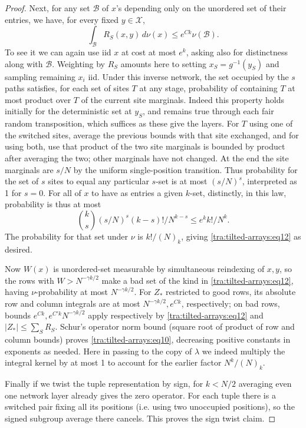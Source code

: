 \begin{proof}
Next, for any set \(\mathcal B\) of \(x\)'s depending only on the unordered set of their entries, we have, for every fixed \(y\in\mathcal X\),
\begin{equation}
 \int_{\mathcal B} R_S(x,y)\,d\nu(x)\le e^{Ck}\nu(\mathcal B). \label{tra:tilted-arrays:eq12}
\end{equation}
To see it we can again use iid \(x\) at cost at most \(e^k\), asking also for distinctness along with \(\mathcal B\). Weighting by \(R_S\) amounts here to setting \(x_S=g^{-1}(y_S)\) and sampling remaining \(x_i\) iid. Under this inverse network, the set occupied by the \(s\) paths satisfies, for each set of sites \(T\) at any stage, probability of containing \(T\) at most product over \(T\) of the current site marginals. Indeed this property holds initially for the deterministic set at \(y_S\), and remains true through each fair random transposition, which suffices as these give the layers. For \(T\) using one of the switched sites, average the previous bounds with that site exchanged, and for using both, use that product of the two site marginals is bounded by product after averaging the two; other marginals have not changed. At the end the site marginals are \(s/N\) by the uniform single-position transition. Thus probability for the set of \(s\) sites to equal any particular \(s\)-set is at most \((s/N)^s\), interpreted as 1 for \(s=0\). For all of \(x\) to have as entries a given \(k\)-set, distinctly, in this law, probability is thus at most
\[
 \binom{k}{s}(s/N)^s (k-s)!/N^{k-s}
 \le e^k k!/N^k .
\]
The probability for that set under \(\nu\) is \(k!/(N)_k\), giving \eqref{tra:tilted-arrays:eq12} as desired.

Now \(W(x)\) is unordered-set measurable by simultaneous reindexing of \(x,y\), so the rows with \(W>N^{-\gamma k/2}\) make a bad set of the kind in \eqref{tra:tilted-arrays:eq12}, having \(\nu\)-probability at most \(N^{-\gamma k/2}\). For \(Z_*\) restricted to good rows, its absolute row and column integrals are at most \(N^{-\gamma k/2}, e^{Ck}\), respectively; on bad rows, bounds \(e^{Ck},e^{C'k} N^{-\gamma k/2}\) apply respectively by \eqref{tra:tilted-arrays:eq12} and \(|Z_*|\le \sum_S R_S\). Schur's operator norm bound (square root of product of row and column bounds) proves \eqref{tra:tilted-arrays:eq10}, decreasing positive constants in exponents as needed. Here in passing to the copy of \(\lambda\) we indeed multiply the integral kernel by at most 1 to account for the earlier factor \(N^k/(N)_k\).

Finally if we twist the tuple representation by sign, for \(k<N/2\) averaging even one network layer already gives the zero operator. For each tuple there is a switched pair fixing all its positions (i.e. using two unoccupied positions), so the signed subgroup average there cancels. This proves the sign twist claim.
\end{proof}
